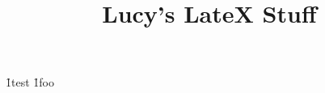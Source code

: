 \begin{html}
    \begin{head}
        \title{Lucy's LateX Stuff}
    \end{head}

    \begin{body}
     \h1{test}
     \h1{foo}
    \end{body}
\end{html}